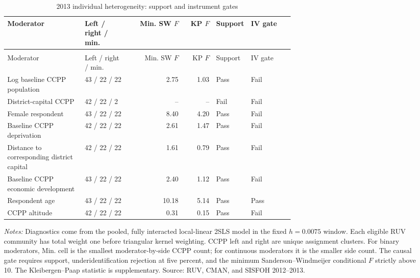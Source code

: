 \begingroup\fontsize{9.25}{11.4}\selectfont
\setlength{\tabcolsep}{3pt}\renewcommand{\arraystretch}{1.18}
\begin{longtable}{@{}>{\raggedright\arraybackslash}p{0.27\linewidth}p{0.16\linewidth}rrp{0.10\linewidth}p{0.15\linewidth}@{}}
\caption{2013 individual heterogeneity: support and instrument gates}\label{tab:pub_A06} \\
\toprule Moderator & Left / right / min. & Min. SW \(F\) & KP \(F\) & Support & IV gate \\ \midrule\endfirsthead
\multicolumn{6}{c}{\tablename\ \thetable{} -- continued} \\
\toprule Moderator & Left / right / min. & Min. SW \(F\) & KP \(F\) & Support & IV gate \\ \midrule\endhead
Log baseline CCPP population & 43 / 22 / 22 & 2.75 & 1.03 & Pass & Fail \\
District-capital CCPP & 42 / 22 / 2 & -- & -- & Fail & Fail \\
Female respondent & 43 / 22 / 22 & 8.40 & 4.20 & Pass & Fail \\
Baseline CCPP deprivation & 42 / 22 / 22 & 2.61 & 1.47 & Pass & Fail \\
Distance to corresponding district capital & 42 / 22 / 22 & 1.61 & 0.79 & Pass & Fail \\
Baseline CCPP economic development & 43 / 22 / 22 & 2.40 & 1.12 & Pass & Fail \\
Respondent age & 43 / 22 / 22 & 10.18 & 5.14 & Pass & Pass \\
CCPP altitude & 42 / 22 / 22 & 0.31 & 0.15 & Pass & Fail \\
\bottomrule\end{longtable}
\parbox{0.97\linewidth}{\footnotesize \textit{Notes:} Diagnostics come from the pooled, fully interacted local-linear 2SLS model in the fixed \(h=0.0075\) window. Each eligible RUV community has total weight one before triangular kernel weighting. CCPP left and right are unique assignment clusters. For binary moderators, Min. cell is the smallest moderator-by-side CCPP count; for continuous moderators it is the smaller side count. The causal gate requires support, underidentification rejection at five percent, and the minimum Sanderson--Windmeijer conditional \(F\) strictly above 10. The Kleibergen--Paap statistic is supplementary. Source: RUV, CMAN, and SISFOH 2012--2013.}
\par{}\par\endgroup
